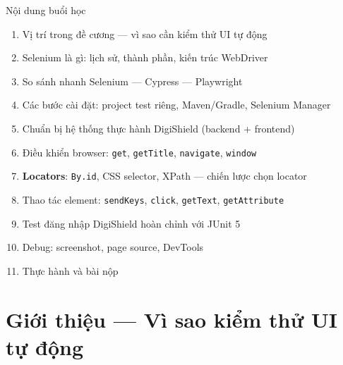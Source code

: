 \documentclass[aspectratio=169,12pt]{beamer}
\begin{document}
\begin{frame}{Nội dung buổi học}
  \begin{enumerate}
    \item Vị trí trong đề cương --- vì sao cần kiểm thử UI tự động
    \item Selenium là gì: lịch sử, thành phần, kiến trúc WebDriver
    \item So sánh nhanh Selenium --- Cypress --- Playwright
    \item Các bước cài đặt: project test riêng, Maven/Gradle, Selenium Manager
    \item Chuẩn bị hệ thống thực hành DigiShield (backend + frontend)
    \item Điều khiển browser: \texttt{get}, \texttt{getTitle}, \texttt{navigate}, \texttt{window}
    \item \textbf{Locators}: \texttt{By.id}, CSS selector, XPath --- chiến lược chọn locator
    \item Thao tác element: \texttt{sendKeys}, \texttt{click}, \texttt{getText}, \texttt{getAttribute}
    \item Test đăng nhập DigiShield hoàn chỉnh với JUnit 5
    \item Debug: screenshot, page source, DevTools
    \item Thực hành và bài nộp
  \end{enumerate}
\end{frame}

\section{Giới thiệu --- Vì sao kiểm thử UI tự động}
\end{document}
